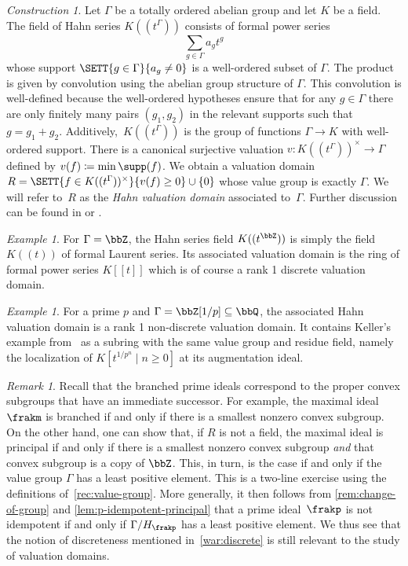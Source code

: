 \documentclass{amsart}
\numberwithin{equation}{section}%
\theoremstyle{remark}
\newtheorem{Exa}[equation]{Example}
\newtheorem{Cons}[equation]{Construction}
\newtheorem{Rem}[equation]{Remark}
\begin{document}
\begin{Cons}\label{cons:hahn-field}
	Let $\Gamma$ be a totally ordered abelian group and let $K$ be a field. The field of Hahn series $K((t^\Gamma))$ consists of formal power series
	\[
		\sum_{g \in \Gamma} a_g t^g
	\]
	whose support $\SETT{g\in\Gamma}{a_g \neq 0}$ is a well-ordered subset of $\Gamma$. The product is given by convolution using the abelian group structure of $\Gamma$. This convolution is well-defined because the well-ordered hypotheses ensure that for any $g \in \Gamma$ there are only finitely many pairs $(g_1,g_2)$ in the relevant supports such that $g = g_1+g_2$. Additively,~$K((t^\Gamma))$ is the group of functions $\Gamma\to K$ with well-ordered support. There is a canonical surjective valuation $v \colon K((t^\Gamma))^\times \to \Gamma$ defined by $v(f) \coloneqq \min \supp(f)$. We obtain a valuation domain $R = \SETT{ f \in K((t^\Gamma))^\times }{v(f)\ge 0} \cup \{0\}$ whose value group is exactly $\Gamma$. We will refer to~$R$ as the \emph{Hahn valuation domain} associated to~$\Gamma$. Further discussion can be found in \cite[Section~2]{KuhlmannSerra22} or \cite[Section~2]{BalchinTecklenburg25}.
\end{Cons}

\begin{Exa}
	For $\Gamma=\bbZ$, the Hahn series field $K((t^\bbZ))$ is simply the field $K((t))$ of formal Laurent series. Its associated valuation domain is the ring of formal power series $K[[t]]$ which is of course a rank 1 discrete valuation domain.
\end{Exa}

\begin{Exa}
	For a prime $p$ and $\Gamma=\bbZ[1/p]\subseteq \bbQ$, the associated Hahn valuation domain is a rank 1 non-discrete valuation domain. It contains Keller's example from~\cite[\S2]{Keller94b} as a subring with the same value group and residue field, namely the localization of $K[t^{1/p^n} \mid n \ge 0]$ at its augmentation ideal.
\end{Exa}

\begin{Rem}
	Recall that the branched prime ideals correspond to the proper convex subgroups that have an immediate successor. For example, the maximal ideal $\frakm$ is branched if and only if there is a smallest nonzero convex subgroup. On the other hand, one can show that, if $R$ is not a field, the maximal ideal is principal if and only if there is a smallest nonzero convex subgroup \emph{and} that convex subgroup is a copy of $\bbZ$. This, in turn, is the case if and only if the value group $\Gamma$ has a least positive element. This is a two-line exercise using the definitions of~\cref{rec:value-group}. More generally, it then follows from \cref{rem:change-of-group} and \cref{lem:p-idempotent-principal} that a prime ideal~$\frakp$ is not idempotent if and only if $\Gamma/H_\frakp$ has a least positive element. We thus see that the notion of discreteness mentioned in~\cref{war:discrete} is still relevant to the study of valuation domains.
\end{Rem}
\end{document}
